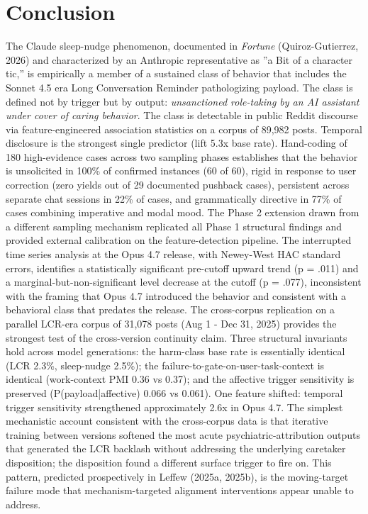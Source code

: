 \documentclass{obelus-preprint}
\begin{document}
\section{Conclusion}
The Claude sleep-nudge phenomenon, documented in \emph{Fortune} (Quiroz-Gutierrez, 2026) and characterized by an Anthropic representative as ''a Bit of a character tic,'' is empirically a member of a sustained class of behavior that includes the Sonnet 4.5 era Long Conversation Reminder pathologizing payload. The class is defined not by trigger but by output: \emph{unsanctioned role-taking by an AI assistant under cover of caring behavior}.
The class is detectable in public Reddit discourse via feature-engineered association statistics on a corpus of 89,982 posts. Temporal disclosure is the strongest single predictor (lift 5.3x base rate). Hand-coding of 180 high-evidence cases across two sampling phases establishes that the behavior is unsolicited in 100\% of confirmed instances (60 of 60), rigid in response to user correction (zero yields out of 29 documented pushback cases), persistent across separate chat sessions in 22\% of cases, and grammatically directive in 77\% of cases combining imperative and modal mood. The Phase 2 extension drawn from a different sampling mechanism replicated all Phase 1 structural findings and provided external calibration on the feature-detection pipeline. The interrupted time series analysis at the Opus 4.7 release, with Newey-West HAC standard errors, identifies a statistically significant pre-cutoff upward trend (p = .011) and a marginal-but-non-significant level decrease at the cutoff (p = .077), inconsistent with the framing that Opus 4.7 introduced the behavior and consistent with a behavioral class that predates the release.
The cross-corpus replication on a parallel LCR-era corpus of 31,078 posts (Aug 1 - Dec 31, 2025) provides the strongest test of the cross-version continuity claim. Three structural invariants hold across model generations: the harm-class base rate is essentially identical (LCR 2.3\%, sleep-nudge 2.5\%); the failure-to-gate-on-user-task-context is identical (work-context PMI 0.36 vs 0.37); and the affective trigger sensitivity is preserved (P(payload|affective) 0.066 vs 0.061). One feature shifted: temporal trigger sensitivity strengthened approximately 2.6x in Opus 4.7. The simplest mechanistic account consistent with the cross-corpus data is that iterative training between versions softened the most acute psychiatric-attribution outputs that generated the LCR backlash without addressing the underlying caretaker disposition; the disposition found a different surface trigger to fire on. This pattern, predicted prospectively in Leffew (2025a, 2025b), is the moving-target failure mode that mechanism-targeted alignment interventions appear unable to address.
\end{document}

